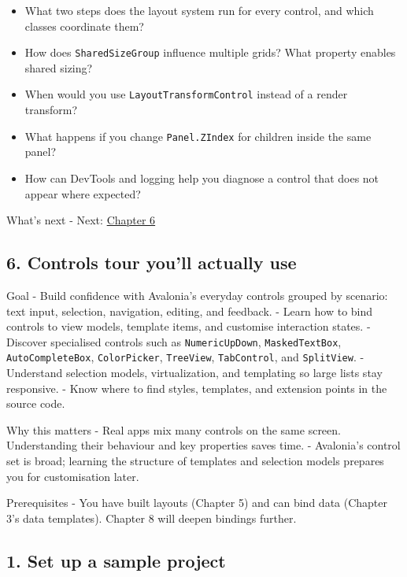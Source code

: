 \begin{itemize}
\tightlist
\item
  What two steps does the layout system run for every control, and which
  classes coordinate them?
\item
  How does \passthrough{\lstinline!SharedSizeGroup!} influence multiple
  grids? What property enables shared sizing?
\item
  When would you use \passthrough{\lstinline!LayoutTransformControl!}
  instead of a render transform?
\item
  What happens if you change \passthrough{\lstinline!Panel.ZIndex!} for
  children inside the same panel?
\item
  How can DevTools and logging help you diagnose a control that does not
  appear where expected?
\end{itemize}

What's next - Next: \href{Chapter06.md}{Chapter 6}

\newpage

\subsection{6. Controls tour you'll actually
use}\label{controls-tour-youll-actually-use}

Goal - Build confidence with Avalonia's everyday controls grouped by
scenario: text input, selection, navigation, editing, and feedback. -
Learn how to bind controls to view models, template items, and customise
interaction states. - Discover specialised controls such as
\passthrough{\lstinline!NumericUpDown!},
\passthrough{\lstinline!MaskedTextBox!},
\passthrough{\lstinline!AutoCompleteBox!},
\passthrough{\lstinline!ColorPicker!},
\passthrough{\lstinline!TreeView!},
\passthrough{\lstinline!TabControl!}, and
\passthrough{\lstinline!SplitView!}. - Understand selection models,
virtualization, and templating so large lists stay responsive. - Know
where to find styles, templates, and extension points in the source
code.

Why this matters - Real apps mix many controls on the same screen.
Understanding their behaviour and key properties saves time. -
Avalonia's control set is broad; learning the structure of templates and
selection models prepares you for customisation later.

Prerequisites - You have built layouts (Chapter 5) and can bind data
(Chapter 3's data templates). Chapter 8 will deepen bindings further.

\subsection{1. Set up a sample project}\label{set-up-a-sample-project}

